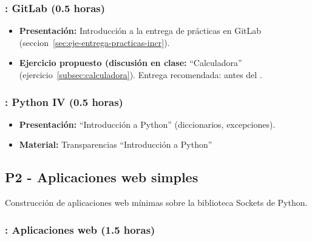 \documentclass[a4paper,12pt]{article}
\begin{document}
\subsubsection{\lunesC: GitLab (0.5 horas)}
\label{cal:lunesCb}

\begin{itemize}
\item \textbf{Presentación:} Introducción a la entrega de prácticas en GitLab (seccion~\ref{sec:eje-entrega-practicas-incr}).

\item \textbf{Ejercicio propuesto (discusión en clase:} ``Calculadora'' (ejercicio~\ref{subsec:calculadora}).
   Entrega recomendada: antes del \lunesD.

\end{itemize}


\subsubsection{\lunesD: Python IV (0.5 horas)}
\label{cal:lunesD}

\begin{itemize}
\item \textbf{Presentación:} ``Introducción a Python'' (diccionarios, excepciones).
\item \textbf{Material:} Transparencias ``Introducción a Python''

\end{itemize}

\subsection{P2 - Aplicaciones web simples}


Construcción de aplicaciones web mínimas sobre la biblioteca Sockets de Python.


\subsubsection{\lunesD: Aplicaciones web (1.5 horas)}
\label{cal:lunesDb}
\end{document}
